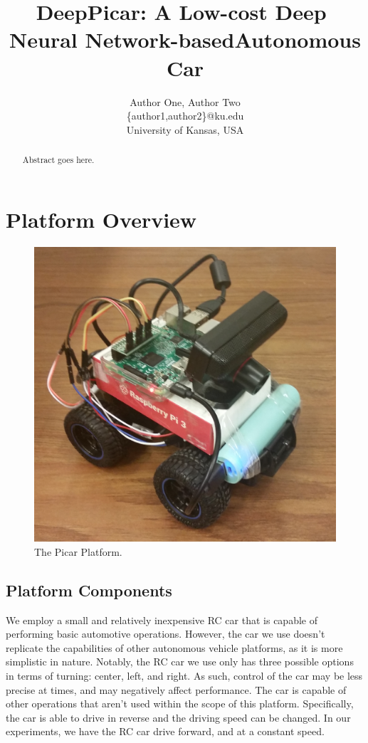 \documentclass[10pt, conference]{IEEEtran}
\begin{document}
\title{DeepPicar:​ ​A​ ​Low-cost​ ​Deep​ ​Neural​ ​Network-based​ ​Autonomous​ ​Car}
\author{Author One, Author Two\\
\{author1,author2\}@ku.edu\\
University of Kansas, USA\\ 
}

\maketitle
\thispagestyle{empty}
\begin{abstract}

Abstract goes here.

\end{abstract}





\section{Platform Overview}

\begin{figure}[h]
  \centering
  \includegraphics[width=.4\textwidth]{Picar_Picture}
  \caption{ The Picar Platform. }
\end{figure}

\subsection{Platform Components}
We employ a small and relatively inexpensive RC car that is capable of performing basic automotive 
operations. However, the car we use doesn't replicate the capabilities of other autonomous vehicle 
platforms, as it is more simplistic in nature. Notably, the RC car we use only has three possible 
options in terms of turning: center, left, and right. As such, control of the car may be less precise at 
times, and may negatively affect performance. The car is capable of other operations that aren't used 
within the scope of this platform. Specifically, the car is able to drive in reverse and the driving 
speed can be changed. In our experiments, we have the RC car drive forward, and at a constant speed.
\end{document}
